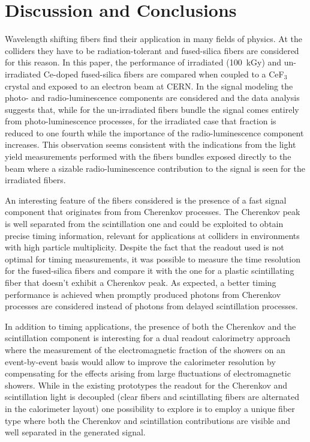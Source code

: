 \documentclass[a4paper,11pt]{article}
\begin{document}
\section{Discussion and Conclusions}
\label{sec:conclusions}
Wavelength shifting fibers find their application in many fields of physics. At the colliders they have to be radiation-tolerant and fused-silica fibers are considered for this reason. In this paper, the performance of irradiated (100~kGy) and un-irradiated Ce-doped fused-silica fibers are compared when coupled to a CeF$_3$ crystal and exposed to an electron beam at CERN. In the signal modeling the photo- and radio-luminescence components are considered and the data analysis suggests that, while for the un-irradiated fibers bundle the signal comes entirely from photo-luminescence processes, for the irradiated case that fraction is reduced to one fourth while the importance of the radio-luminescence component increases. This observation seems consistent with the indications from the light yield measurements performed with the fibers bundles exposed directly to the beam where a sizable radio-luminescence contribution to the signal is seen for the irradiated fibers.

An interesting feature of the fibers considered is the presence of a fast signal component that originates from from Cherenkov processes. The Cherenkov peak is well separated from the scintillation one and could be exploited to obtain precise timing information, relevant for applications at colliders in environments with high particle multiplicity. Despite the fact that the readout used is not optimal for timing measurements, it was possible to measure the time resolution for the fused-silica fibers and compare it with the one for a plastic scintillating fiber that doesn't exhibit a Cherenkov peak. As expected, a better timing performance is achieved when promptly produced photons from Cherenkov processes are considered instead of photons from delayed scintillation processes.

In addition to timing applications, the presence of both the Cherenkov and the scintillation component is interesting for a dual readout calorimetry approach where the measurement of the electromagnetic fraction of the showers on an event-by-event basis would allow to improve the calorimeter resolution by compensating for the effects arising from large fluctuations of electromagnetic showers. While in the existing prototypes the readout for the Cherenkov and scintillation light is decoupled (clear fibers and scintillating fibers are alternated in the calorimeter layout) one possibility to explore is to employ a unique fiber type where both the Cherenkov and scintillation contributions are visible and well separated in the generated signal.
\end{document}
